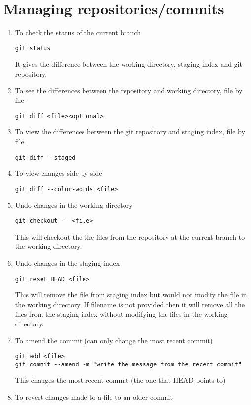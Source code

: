 \documentclass[paper=a4, fontsize=12pt]{scrartcl}
\begin{document}
\section*{Managing repositories/commits}
\begin{enumerate}
\item To check the status of the current branch
\begin{lstlisting}
git status
\end{lstlisting}
It gives the difference between the working directory, staging index and git repository.
\item To see the differences between the repository and working directory, file by file
\begin{lstlisting}
git diff <file><optional>
\end{lstlisting}
\item To view the differences between the git repository and staging index, file by file
\begin{lstlisting}
git diff --staged
\end{lstlisting}
\item To view changes side by side
\begin{lstlisting}
git diff --color-words <file>
\end{lstlisting}
\item Undo changes in the working directory
\begin{lstlisting}
git checkout -- <file>
\end{lstlisting}
This will checkout the the files from the repository at the current branch to the working directory.
\item Undo changes in the staging index
\begin{lstlisting}
git reset HEAD <file>
\end{lstlisting}
This will remove the file from staging index but would not modify the file in the working directory. If filename is not provided then it will remove all the files from the staging index without modifying the files in the working directory.
\item To amend the commit (can only change the most recent commit)
\begin{lstlisting}
git add <file>
git commit --amend -m "write the message from the recent commit"
\end{lstlisting}
This changes the most recent commit (the one that HEAD points to)
\item To revert changes made to a file to an older commit
\begin{lstlisting}

\end{lstlisting}
\end{enumerate}
\end{document}
